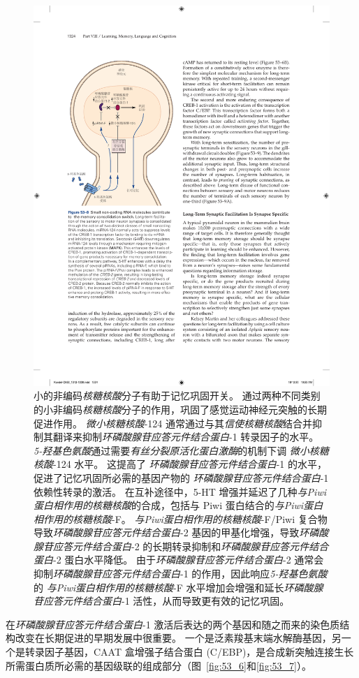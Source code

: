 \begin{figure}[htbp]
	\centering
	\includegraphics[width=0.55\linewidth]{chap53/fig_53_8}
	\caption{小的非编码\textit{核糖核酸}分子有助于记忆巩固开关。
		通过两种不同类别的小非编码\textit{核糖核酸}分子的作用，巩固了感觉运动神经元突触的长期促进作用。
		\textit{微小核糖核酸}-124 通常通过与其\textit{信使核糖核酸}结合并抑制其翻译来抑制\textit{环磷酸腺苷应答元件结合蛋白}-1 转录因子的水平。
		\textit{5-羟基色氨酸}通过需要\textit{有丝分裂原活化蛋白激酶}的机制下调 \textit{微小核糖核酸}-124 水平。
		这提高了 \textit{环磷酸腺苷应答元件结合蛋白}-1 的水平，促进了记忆巩固所必需的基因产物的 \textit{环磷酸腺苷应答元件结合蛋白}-1 依赖性转录的激活。
		在互补途径中，5-HT 增强并延迟了几种\textit{与Piwi蛋白相作用的核糖核酸}的合成，包括与 Piwi 蛋白结合的\textit{与Piwi蛋白相作用的核糖核酸}-F。
		\textit{与Piwi蛋白相作用的核糖核酸}-F/Piwi 复合物导致\textit{环磷酸腺苷应答元件结合蛋白}-2 基因的甲基化增强，导致\textit{环磷酸腺苷应答元件结合蛋白}-2 的长期转录抑制和\textit{环磷酸腺苷应答元件结合蛋白}-2 蛋白水平降低。
		由于\textit{环磷酸腺苷应答元件结合蛋白}-2 通常会抑制\textit{环磷酸腺苷应答元件结合蛋白}-1 的作用，因此响应\textit{5-羟基色氨酸}的 \textit{与Piwi蛋白相作用的核糖核酸}-F 水平增加会增强和延长\textit{环磷酸腺苷应答元件结合蛋白}-1 活性，从而导致更有效的记忆巩固。}
	\label{fig:53_8}
\end{figure}


在\textit{环磷酸腺苷应答元件结合蛋白}-1 激活后表达的两个基因和随之而来的染色质结构改变在长期促进的早期发展中很重要。
一个是泛素羧基末端水解酶基因，另一个是转录因子基因，CAAT 盒增强子结合蛋白 (C/EBP)，是合成新突触连接生长所需蛋白质所必需的基因级联的组成部分（图~\ref{fig:53_6}和\ref{fig:53_7}）。


